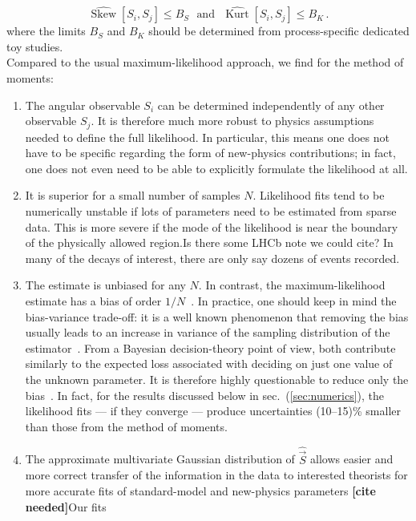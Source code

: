 \documentclass[aps,prd,reprint,nofootinbib,preprintnumbers]{revtex4}
\newcommand{\est}[1]{\widehat{#1}}
\newcommand{\refsec}[1]{sec.~(\ref{sec:#1})}
\newcommand{\vecest}[1]{\widehat{\vec{#1}}}
\DeclareMathOperator{\kurt}{Kurt}
\newcommand{\fred}[1]{{\color{brown!85!black}#1}}
\newcommand{\citeneeded}{{\color{red}\bf [cite needed]}}
\begin{document}
\begin{equation}
    \est{\operatorname{Skew}}[S_i,S_j] \leq B_S\,\,\text{ and }\,\,\est{\kurt}[S_i,S_j] \leq B_K\,.
\end{equation}
where the limits $B_S$ and $B_K$ should be determined from process-specific dedicated toy studies.\\

Compared to the usual maximum-likelihood approach, we find for the method of moments:
\begin{enumerate}
  \item The angular observable ${S_i}$ can be determined
  independently of any other observable ${S_j}$. It is therefore
  much more robust to physics assumptions needed to define the full
  likelihood. In particular, this means one does not have to be
  specific regarding the form of new-physics contributions; in fact,
  one does not even need to be able to explicitly formulate the
  likelihood at all.
\item It is superior for a small number of samples $N$. Likelihood
  fits tend to be numerically unstable if lots of parameters need to
  be estimated from sparse data. This is more severe if the mode of
  the likelihood is near the boundary of the physically allowed
  region.\fred{Is there some LHCb note we could cite?} In many of the
  decays of interest, there are only say dozens of events recorded.
\item The estimate is unbiased for any $N$. In contrast, the
  maximum-likelihood estimate has a bias of order
  $1/N$~\cite{Cox:1968}. In practice, one should keep in mind the
  bias-variance trade-off: it is a well known phenomenon that removing
  the bias usually leads to an increase in variance of the sampling
  distribution of the estimator~\cite[sec. 7.3]{James:2006zz}. From a
  Bayesian decision-theory point of view, both contribute similarly to
  the expected loss associated with deciding on just one value of the
  unknown parameter. It is therefore highly questionable to reduce
  only the bias~\cite[sections 13.8,17.2]{jaynes:2003}. In fact, for
  the results discussed below in \refsec{numerics}, the likelihood
  fits --- if they converge --- produce uncertainties (10--15)\%
  smaller than those from the method of moments.
  \item The approximate multivariate Gaussian distribution of $\vecest{S}$
  allows easier and more correct transfer of the information in the
  data to interested theorists for more accurate fits of
  standard-model and new-physics parameters \citeneeded\fred{Our fits
}
\end{enumerate}
\end{document}

